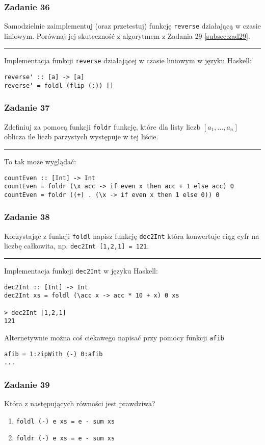 \documentclass[11pt,a4paper]{article}
\begin{document}
\subsubsection{Zadanie 36}
Samodzielnie zaimplementuj (oraz przetestuj) funkcję \texttt{reverse} działającą w czasie liniowym. Porównaj jej skuteczność z algorytmem z Zadania 29 \ref{subsec:zad29}.

\bigskip
\hrule
\bigskip

Implementacja funkcji \texttt{reverse} działającej w czasie liniowym w języku Haskell:
\begin{Verbatim}[frame=single]
reverse' :: [a] -> [a]
reverse' = foldl (flip (:)) []
\end{Verbatim}

\subsubsection{Zadanie 37}
Zdefiniuj za pomocą funkcji \texttt{foldr} funkcję, które dla listy liczb $[a_1, \dots, a_n]$ oblicza ile liczb parzystych występuje w tej liście.

\bigskip
\hrule
\bigskip

To tak może wyglądać:
\begin{Verbatim}[frame=single]
countEven :: [Int] -> Int
countEven = foldr (\x acc -> if even x then acc + 1 else acc) 0
countEven = foldr ((+) . (\x -> if even x then 1 else 0)) 0
\end{Verbatim}

\subsubsection{Zadanie 38}
Korzystając z funkcji \texttt{foldl} napisz funkcję \texttt{dec2Int} która konwertuje ciąg cyfr na liczbę całkowita, np. \texttt{dec2Int [1,2,1] = 121}.

\bigskip
\hrule
\bigskip

Implementacja funkcji \texttt{dec2Int} w języku Haskell:
\begin{Verbatim}[frame=single]
dec2Int :: [Int] -> Int
dec2Int xs = foldl (\acc x -> acc * 10 + x) 0 xs

> dec2Int [1,2,1]
121
\end{Verbatim}
Alternetywnie można coś ciekawego napisać przy pomocy funkcji \texttt{afib}
\begin{Verbatim}[frame=single]
afib = 1:zipWith (-) 0:afib
...
\end{Verbatim}

\subsubsection{Zadanie 39}
Która z następujących równości jest prawdziwa?
\begin{enumerate}
    \item \texttt{foldl (-) e xs = e - sum xs}
    \item \texttt{foldr (-) e xs = e - sum xs}
\end{enumerate}
\end{document}
